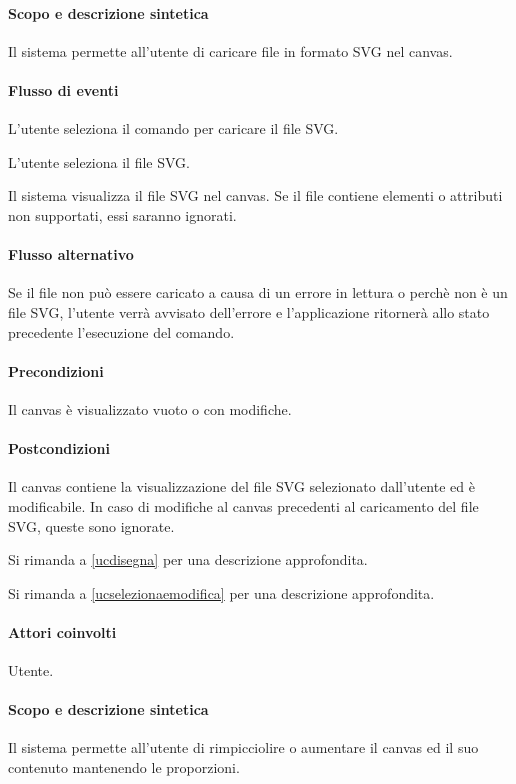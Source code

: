 \paragraph{Scopo e descrizione sintetica} 
Il sistema permette all'utente di caricare file in formato SVG nel canvas.
\paragraph{Flusso di eventi}
\begin{elenconumerato}[\textbf{}]{\subsubsecindent}
\item L'utente seleziona il comando per caricare il file SVG.
\item L'utente seleziona il file SVG.
\item Il sistema visualizza il file SVG nel canvas. Se il file contiene elementi o attributi non supportati, essi saranno ignorati.
\end{elenconumerato}
\paragraph{Flusso alternativo}
Se il file non pu\`o essere caricato a causa di un errore in lettura o perch\`e non \`e un file SVG, l'utente verr\`a avvisato dell'errore e l'applicazione ritorner\`a allo stato precedente l'esecuzione del comando.
\paragraph{Precondizioni} Il canvas \`e visualizzato vuoto o con modifiche.
\paragraph{Postcondizioni} Il canvas contiene la visualizzazione del file SVG selezionato dall'utente ed \`e modificabile. In caso di modifiche al canvas precedenti al caricamento del file SVG, queste sono ignorate.

Si rimanda a \ref{ucdisegna} per una descrizione approfondita.

Si rimanda a \ref{ucselezionaemodifica} per una descrizione approfondita.

\paragraph{Attori coinvolti} Utente.
\paragraph{Scopo e descrizione sintetica} 
Il sistema permette all'utente di rimpicciolire o aumentare il canvas ed il suo contenuto mantenendo le proporzioni.
